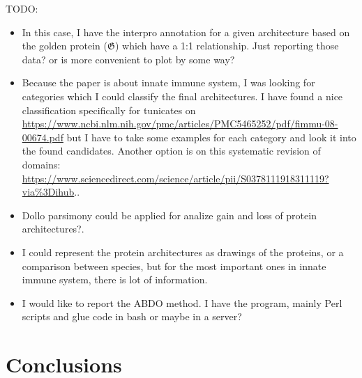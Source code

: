 \documentclass[11pt]{article}
\newcommand{\TODO}[1]{\begingroup\color{red}#1\endgroup}
\begin{document}
\TODO{TODO:}
\begin{itemize}
\item \TODO{In this case, I have the interpro annotation for a given architecture based
on the golden protein ($\boldsymbol{\mathfrak{G}}$) which have a 1:1 relationship. Just
reporting those data? or is more convenient to plot by some way?}
\item \TODO{Because the paper is about innate immune system, I was looking for 
categories which I could classify the final architectures. I have found a nice classification
specifically for tunicates on \url{https://www.ncbi.nlm.nih.gov/pmc/articles/PMC5465252/pdf/fimmu-08-00674.pdf} but I have to take some examples for each category and look it into
the found candidates. Another option is on this systematic revision of domains: \url{https://www.sciencedirect.com/science/article/pii/S0378111918311119?via\%3Dihub}.}.
\item \TODO{Dollo parsimony could be applied for analize gain and loss of protein architectures?.}
\item \TODO{I could represent the protein architectures as drawings of the proteins, or a comparison between species, but for the most important ones in innate immune system, there is lot of information.}
\item \TODO{I would like to report the ABDO method. I have the program, mainly Perl scripts and glue code in bash or maybe in a server?}
\end{itemize}

\section*{Conclusions}


\end{document}

